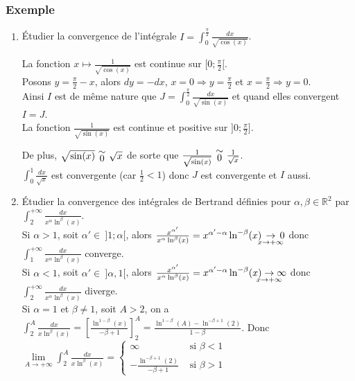 \documentclass[a4paper,10pt]{book} %
\newcommand{\R}{\mathbb{R}}
\newcommand{\equi}[1]{\renewcommand{\arraystretch}{0.3}~\begin{matrix}\sim\\#1\end{matrix}~\renewcommand{\arraystretch}{1}}
\newcommand{\displayAmath}{\displaystyle}
\begin{document}
\subsubsection{Exemple}
\begin{enumerate}
\item
Étudier la convergence de l'intégrale $\displayAmath I=\int_0^{\frac{\pi}{2}} \frac{dx}{\sqrt{\cos(x)}}$.

La fonction $x\mapsto \frac{1}{\sqrt{\cos(x)}}$ est continue sur $[0;\frac{\pi}{2}[$.\\
Posons $y=\frac{\pi}{2}-x$, alors $dy=-dx$,
$x=0 \Rightarrow y=\frac{\pi}{2}$ et
$x=\frac{\pi}{2} \Rightarrow y=0$.\\

Ainsi $I$ est de même nature que $\displayAmath J=\int_0^{\frac{\pi}{2}}\frac{dx}{\sqrt{\sin(x)}}$ et quand elles convergent $I=J$.\\

La fonction $\frac{1}{\sqrt{\sin(x)}}$ est continue et positive sur $]0;\frac{\pi}{2}]$.

De plus, $\sqrt{\sin(x)}\equi{0}\sqrt{x}$ de sorte que $\frac{1}{\sqrt{\sin(x)}}\equi{0}\frac{1}{\sqrt{x}}$.\\

$\displayAmath\int_0^1\frac{dx}{\sqrt{x}}$ est convergente (car $\frac{1}{2}<1$) donc $J$ est convergente et $I$ aussi.\\

\item Étudier la convergence des intégrales de Bertrand définies pour $\alpha,\beta\in\R^2$ par $\displayAmath\int_2^{+\infty} \frac{dx}{x^\alpha\ln^\beta(x)}$.\\

Si $\alpha>1$, soit $\alpha'\in~]1;\alpha[$, alors $\frac{x^{\alpha'}}{x^\alpha\ln^\beta(x)}=x^{\alpha'-\alpha}\ln^{-\beta}(x) \underset{~~\mathclap{x\rightarrow +\infty}~~}{\rightarrow}0$ donc $\displayAmath\int_1^{+\infty}\frac{dx}{x^\alpha\ln^{\beta}(x)}$ converge.\\

Si $\alpha < 1$, soit $\alpha'\in~]\alpha,1[$, alors
$\frac{x^{\alpha'}}{x^\alpha\ln^\beta(x)} =x^{\alpha'-\alpha}\ln^{-\beta}(x)\underset{\mathclap{x\rightarrow+\infty}}{\rightarrow}\infty$ donc $\displayAmath\int_{2}^{+\infty}\frac{dx}{x^\alpha\ln^\beta(x)}$ diverge.\\

Si $\alpha = 1$ et $\beta\neq 1$, soit $A>2$, on a
$\displayAmath\int_{2}^{A}\frac{dx}{x\ln^\beta(x)}=\left[\frac{\ln^{1-\beta}(x)}{-\beta +1}\right]_2^A=\frac{\ln^{1-\beta}(A)-\ln^{-\beta +1}(2)}{1-\beta}$.
Donc $\displayAmath \lim\limits_{A\rightarrow +\infty}\int_2^A\frac{dx}{x\ln^\beta(x)}=\left\{ \begin{array}{cl}
\infty &\text{ si } \beta<1\\
\displayAmath -\frac{\ln^{-\beta +1}(2)}{-\beta+1} & \text{ si }\beta>1
\end{array}\right.$\\\\


\end{enumerate}
\end{document}
